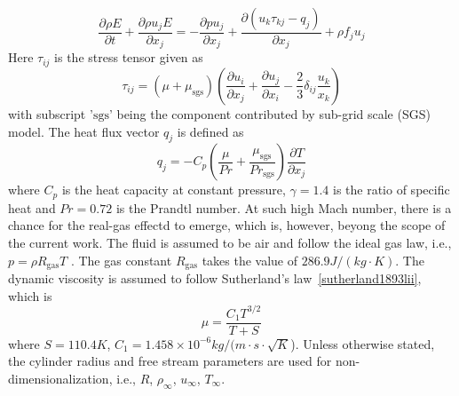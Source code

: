 \documentclass[lineno]{jfm}
\begin{document}
\begin{equation}
\dfrac{\partial \rho E}{\partial t} + \dfrac{\partial \rho u_j E }{\partial x_j} = -\dfrac{\partial p u_j}{\partial x_j} + \dfrac{\partial (u_k\tau_{kj}-q_j)}{\partial x_j} + \rho f_j u_j
\end{equation}
Here $\tau_{ij}$ is the stress tensor given as 
\begin{equation}
\tau_{ij} = (\mu+\mu_\text{sgs})\left( \dfrac{\partial u_i}{\partial x_j}+ \dfrac{\partial u_j}{\partial x_i}-\dfrac{2}{3}\delta_{ij}\dfrac{u_k}{x_k}\right)
\end{equation}
with subscript '$\text{sgs}$' being the component contributed by sub-grid scale (SGS) model. The heat flux vector $q_j$ is defined as 
\begin{equation}
q_j = -C_p(\dfrac{\mu}{Pr}+ \dfrac{\mu_\text{sgs}}{Pr_\text{sgs}} )\dfrac{\partial T}{\partial x_j}
\end{equation}
where $C_p$ is the heat capacity at constant pressure, $\gamma = 1.4$ is the ratio of specific heat and $Pr = 0.72$ is the Prandtl number. At such high Mach number, there is a chance for the real-gas effectd to emerge, which is, however, beyong the scope of the current work. The fluid is assumed to be air and follow the ideal gas law, i.e., $p = \rho R_\text{gas} T$ . The gas constant $R_\text{gas}$ takes the value of $286.9 J/(kg\cdot K)$. The dynamic viscosity is assumed to follow Sutherland's law~\ref{sutherland1893lii}, which is 
\begin{equation}
  \mu = \dfrac{C_1 T^{3/2}}{T+S}
\end{equation}
where $S = 110.4 K$, $C_1 = 1.458 \times 10^{-6} kg/(m\cdot s \cdot \sqrt{K}$). Unless otherwise stated, the cylinder radius and free stream parameters are used for non-dimensionalization, i.e., $R$, $\rho_\infty$, $u_\infty$, $T_\infty$. 
\end{document}
